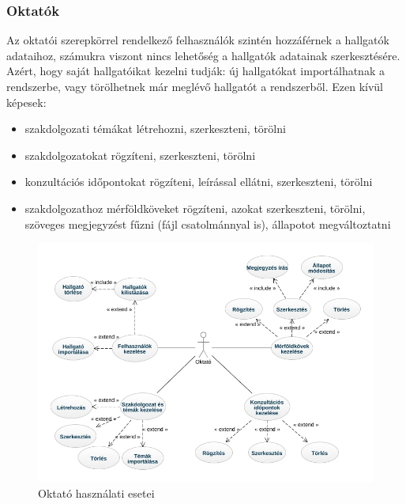 \documentclass[
]{thesis-ekf}
\theoremstyle{definition}
\theoremstyle{remark}
\begin{document}
	\subsubsection{Oktatók}
	Az oktatói szerepkörrel rendelkező felhasználók szintén hozzáférnek a hallgatók adataihoz, számukra viszont nincs lehetőség a hallgatók adatainak szerkesztésére. 
	Azért, hogy saját hallgatóikat kezelni tudják: új hallgatókat importálhatnak a rendszerbe, vagy törölhetnek már meglévő hallgatót a rendszerből. Ezen kívül képesek:
	\begin{itemize}
		\item szakdolgozati témákat létrehozni, szerkeszteni, törölni
		\item szakdolgozatokat rögzíteni, szerkeszteni, törölni
		\item konzultációs időpontokat rögzíteni, leírással ellátni, szerkeszteni, törölni
		\item szakdolgozathoz mérföldköveket rögzíteni, azokat szerkeszteni, törölni, szöveges megjegyzést fűzni (fájl csatolmánnyal is), állapotot megváltoztatni
	\end{itemize}
	\begin{figure}[!h]
		\centering
		\includegraphics[width=14cm]{kepek/oktato_usecase.jpg}
		\caption{Oktató használati esetei}
		\label{fig:oktato_usecase}
	\end{figure}
	\newpage
\end{document}
